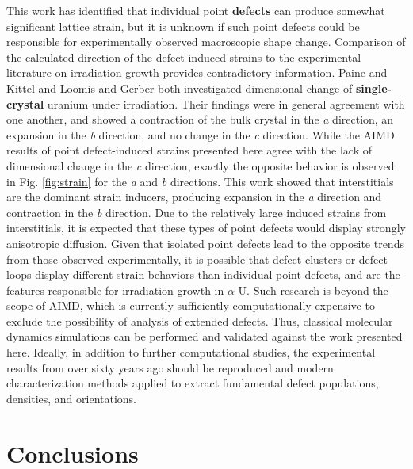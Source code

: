 \documentclass[utf8]{frontiersSCNS} %
\providecommand{\DIFaddtex}[1]{{\bf #1}} %
\providecommand{\DIFdeltex}[1]{} %
\providecommand{\DIFaddbegin}{\protect\color{blue}} %
\providecommand{\DIFaddend}{\protect\color{black}} %
\providecommand{\DIFdelbegin}{\protect\color{red}} %
\providecommand{\DIFdelend}{\protect\color{black}} %
\providecommand{\DIFadd}[1]{\texorpdfstring{\DIFaddtex{#1}}{#1}} %
\providecommand{\DIFdel}[1]{\texorpdfstring{\DIFdeltex{#1}}{}} %
\begin{document}
This work has identified that individual point \DIFdelbegin \DIFdel{defect }\DIFdelend \DIFaddbegin \DIFadd{defects }\DIFaddend can produce somewhat significant lattice strain, but it is unknown if such point defects could be responsible for experimentally observed macroscopic shape change. Comparison of the calculated direction of the defect-induced strains to the experimental literature on irradiation growth provides contradictory information. Paine and Kittel \cite{paine1958} and Loomis and Gerber \cite{loomis1968} both investigated dimensional change of \DIFdelbegin \DIFdel{single crystal }\DIFdelend \DIFaddbegin \DIFadd{single-crystal }\DIFaddend uranium under irradiation. Their findings were in general agreement with one another, and showed a contraction of the bulk crystal in the \textit{a} direction, an expansion in the \textit{b} direction, and no change in the \textit{c} direction. While the AIMD results of point defect-induced strains presented here agree with the lack of dimensional change in the \textit{c} direction, exactly the opposite behavior is observed in Fig. \ref{fig:strain} for the \textit{a} and \textit{b} directions. This work showed that interstitials are the dominant strain inducers, producing expansion in the \textit{a} direction and contraction in the \textit{b} direction. Due to the relatively large induced strains from interstitials, it is expected that these types of point defects would display strongly anisotropic diffusion. Given that isolated point defects lead to the opposite trends from those observed experimentally, it is possible that defect clusters or defect loops display different strain behaviors than individual point defects, and are the features responsible for irradiation growth in $\alpha$-U. Such research is beyond the scope of AIMD, which is currently sufficiently computationally expensive to exclude the possibility of analysis of extended defects. Thus, classical molecular dynamics simulations can be performed \DIFdelbegin \DIFdel{, }\DIFdelend and validated against the work presented here. Ideally, in addition to further computational studies, the experimental results from over sixty years ago should be reproduced and modern characterization methods applied to extract fundamental defect populations, densities, and orientations. 

\FloatBarrier

\section{Conclusions}
\end{document}
